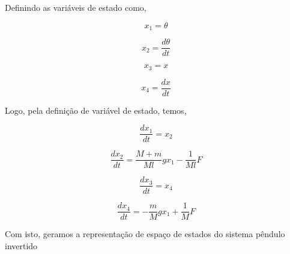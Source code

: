 \documentclass[a4paper, 12pt]{article}
\begin{document}
Definindo as variáveis de estado como,

\begin{equation}\label{eq:movi_12}
   x_{1} = \theta
\end{equation}

\begin{equation}\label{eq:movi_12}
    x_{2} = \frac{d\theta}{dt}
\end{equation}

\begin{equation}\label{eq:movi_12}
   x_{3} = x
\end{equation}

\begin{equation}\label{eq:movi_12}
   x_{4} = \frac{dx}{dt}
\end{equation}

Logo, pela definição de variável de estado, temos,

\begin{equation}\label{eq:movi_12}
   \frac{dx_{1}}{dt} = x_{2}
\end{equation}

\begin{equation}\label{eq:movi_12}
    \frac{dx_{2}}{dt} = \frac{M + m}{Ml}gx_{1} - \frac{1}{Ml}F
\end{equation}

\begin{equation}\label{eq:movi_12}
   \frac{dx_{3}}{dt} = x_{4}
\end{equation}

\begin{equation}\label{eq:movi_12}
   \frac{dx_{4}}{dt} = -\frac{m}{M}gx_{1} + \frac{1}{M}F 
\end{equation}

Com isto, geramos a representação de espaço de estados do sistema pêndulo invertido
\end{document}
